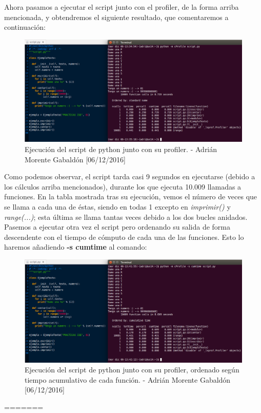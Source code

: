 Ahora pasamos a ejecutar el script junto con el profiler, de la forma arriba mencionada, y obtendremos el siguiente resultado, que comentaremos a continuación:
\begin{figure}[H]
	\centering
	\includegraphics[scale=0.4]{python-cprofile}
	\caption{Ejecución del script de python junto con su profiler. - Adrián Morente Gabaldón [06/12/2016]}
	\label{figura7}
\end{figure}
Como podemos observar, el script tarda casi 9 segundos en ejecutarse (debido a los cálculos arriba mencionados), durante los que ejecuta 10.009 llamadas a funciones. En la tabla mostrada tras su ejecución, vemos el número de veces que se llama a cada una de éstas, siendo en todas 1 excepto en \emph{imprimir()} y \emph{range(...)}; esta última se llama tantas veces debido a los dos bucles anidados. Pasemos a ejecutar otra vez el script pero ordenando su salida de forma descendente con el tiempo de cómputo de cada una de las funciones. Esto lo haremos añadiendo \textbf{-s cumtime} al comando:
\begin{figure}[H]
	\centering
	\includegraphics[scale=0.4]{python-cumtime}
	\caption{Ejecución del script de python junto con su profiler, ordenado según tiempo acumulativo de cada función. - Adrián Morente Gabaldón [06/12/2016]}
	\label{figura8}
\end{figure}
=======


